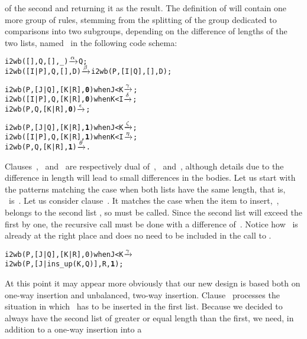 of the second and returning it as the result. The definition of
 will contain one more group of rules, stemming from
the splitting of the group dedicated to comparisons into two
subgroups, depending on the difference of lengths of the two lists,
named~ in the following code schema:
\begin{alltt}
i2wb(   [],    Q,   [],_)            \(\smashedrightarrow{\alpha}\) Q;
i2wb([I|P],    Q,   [],D)            \(\smashedrightarrow{\beta}\) i2wb(P,[I|Q],[],D);

i2wb(    P,[J|Q],[K|R],\textbf{0}) when J < K \(\smashedrightarrow{\gamma}\) ;
i2wb([I|P],    Q,[K|R],\textbf{0}) when K < I \(\smashedrightarrow{\delta}\) ;
i2wb(    P,    Q,[K|R],\textbf{0})            \(\smashedrightarrow{\epsilon}\) ;

i2wb(    P,[J|Q],[K|R],\textbf{1}) when J < K \(\smashedrightarrow{\zeta}\) ;
i2wb([I|P],    Q,[K|R],\textbf{1}) when K < I \(\smashedrightarrow{\eta}\) ;
i2wb(    P,    Q,[K|R],\textbf{1})            \(\smashedrightarrow{\theta}\) .
\end{alltt}
Clauses~\clause{\gamma}, \clause{\delta}~and~\clause{\epsilon} are
respectively dual of~\clause{\zeta},
\clause{\eta}~and~\clause{\theta}, although details due to the
difference in length will lead to small differences in the bodies. Let
us start with the patterns matching the case when both lists have the
same length, that is, ~is~. Let us consider
clause~\clause{\gamma}. It matches the case when the item to
insert,~, belongs to the second list \erlcode{[J|Q]}, so
 must be called. Since the second list will exceed
the first by one, the recursive call must be done with a difference
of~. Notice how~ is already at the right place
and does no need to be included in the call to .
\begin{alltt}
i2wb(P,[J|Q],[K|R],0) when J < K \(\smashedrightarrow{\gamma}\)
\hfill i2wb(P,[J|ins_up(K,Q)],R,\textbf{1});
\end{alltt}
At this point it may appear more obviously that our new design is
based both on one\hyp{}way insertion and unbalanced, two\hyp{}way
insertion. Clause~\clause{\delta} processes the situation in
which~ has to be inserted in the first list. Because we
decided to always have the second list of greater or equal length than
the first, we need, in addition to a one\hyp{}way insertion into a
